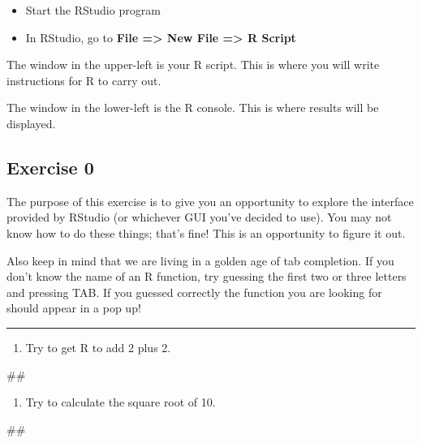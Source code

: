 \documentclass[]{book}
\newenvironment{Shaded}{\begin{snugshade}}{\end{snugshade}}
\newcommand{\NormalTok}[1]{#1}
\providecommand{\tightlist}{%
  \setlength{\itemsep}{0pt}\setlength{\parskip}{0pt}}
\begin{document}
\begin{itemize}
\tightlist
\item
  Start the RStudio program
\item
  In RStudio, go to \textbf{File =\textgreater{} New File
  =\textgreater{} R Script}
\end{itemize}

The window in the upper-left is your R script. This is where you will
write instructions for R to carry out.

The window in the lower-left is the R console. This is where results
will be displayed.

\subsection{Exercise 0}\label{exercise-0}

The purpose of this exercise is to give you an opportunity to explore
the interface provided by RStudio (or whichever GUI you've decided to
use). You may not know how to do these things; that's fine! This is an
opportunity to figure it out.

Also keep in mind that we are living in a golden age of tab completion.
If you don't know the name of an R function, try guessing the first two
or three letters and pressing TAB. If you guessed correctly the function
you are looking for should appear in a pop up!

\begin{center}\rule{0.5\linewidth}{\linethickness}\end{center}

\begin{enumerate}
\def\labelenumi{\arabic{enumi}.}
\tightlist
\item
  Try to get R to add 2 plus 2.
\end{enumerate}

\begin{Shaded}
\begin{Highlighting}[]
\NormalTok{##}
\end{Highlighting}
\end{Shaded}

\begin{enumerate}
\def\labelenumi{\arabic{enumi}.}
\setcounter{enumi}{1}
\tightlist
\item
  Try to calculate the square root of 10.
\end{enumerate}

\begin{Shaded}
\begin{Highlighting}[]
\NormalTok{##}
\end{Highlighting}
\end{Shaded}
\end{document}
